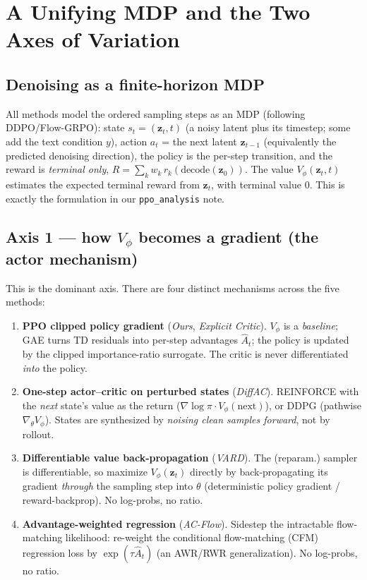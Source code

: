 \documentclass[11pt]{article}
\theoremstyle{remark}
\newcommand{\zt}{\bm{z}}
\newcommand{\Vphi}{V_\phi}
\begin{document}
\section{A Unifying MDP and the Two Axes of Variation}
\label{sec:taxonomy}

\subsection{Denoising as a finite-horizon MDP}
All methods model the ordered sampling steps as an MDP (following DDPO/Flow-GRPO):
state $s_t=(\zt_t, t)$ (a noisy latent plus its timestep; some add the text condition
$y$), action $a_t$ = the next latent $\zt_{t-1}$ (equivalently the predicted denoising
direction), the policy is the per-step transition, and the reward is \emph{terminal
only}, $R=\sum_k w_k\, r_k(\text{decode}(\zt_0))$. The value $\Vphi(\zt_t,t)$ estimates
the expected terminal reward from $\zt_t$, with terminal value $0$. This is exactly the
formulation in our \texttt{ppo\_analysis} note.

\subsection{Axis 1 --- how $\Vphi$ becomes a gradient (the actor mechanism)}
This is the dominant axis. There are four distinct mechanisms across the five methods:

\begin{enumerate}[leftmargin=1.6em]
  \item \textbf{PPO clipped policy gradient} (\emph{Ours}, \emph{Explicit Critic}).
  $\Vphi$ is a \emph{baseline}; GAE turns TD residuals into per-step advantages
  $\hat A_t$; the policy is updated by the clipped importance-ratio surrogate. The
  critic is never differentiated \emph{into} the policy.
  \item \textbf{One-step actor--critic on perturbed states} (\emph{DiffAC}).
  REINFORCE with the \emph{next} state's value as the return
  ($\nabla\!\log\pi\cdot \Vphi(\text{next})$), or DDPG (pathwise $\nabla_\theta\Vphi$).
  States are synthesized by \emph{noising clean samples forward}, not by rollout.
  \item \textbf{Differentiable value back-propagation} (\emph{VARD}). The (reparam.)
  sampler is differentiable, so maximize $\Vphi(\zt_t)$ directly by back-propagating
  its gradient \emph{through} the sampling step into $\theta$ (deterministic policy
  gradient / reward-backprop). No log-probs, no ratio.
  \item \textbf{Advantage-weighted regression} (\emph{AC-Flow}). Sidestep the
  intractable flow-matching likelihood: re-weight the conditional flow-matching (CFM)
  regression loss by $\exp(\tau\hat A_t)$ (an AWR/RWR generalization). No log-probs, no
  ratio.
\end{enumerate}
\end{document}
